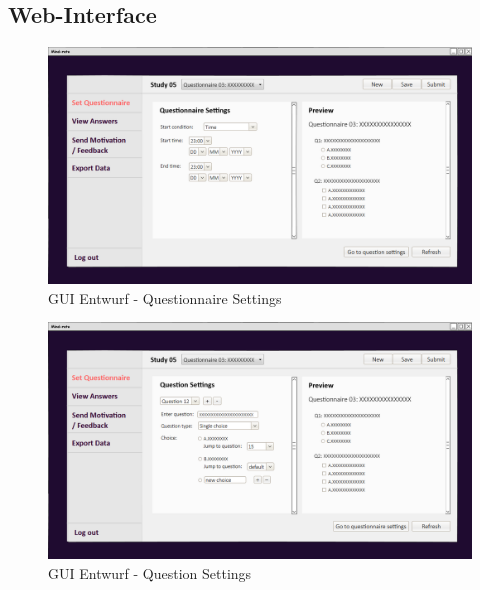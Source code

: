 \documentclass[a4paper]{scrreprt}
\begin{document}
            \vspace*{1cm}
            \subsection{\gls{Web-Interface}}
                \vspace*{1.5cm}
                \begin{figure}[ht]
                    \centering
                    \includegraphics[scale = 0.25]{web_set1.png}
                    \caption{GUI Entwurf - Questionnaire Settings}
                \end{figure}

                \begin{figure}[ht]
                    \centering
                    \includegraphics[scale = 0.25]{web_set2.png}
                    \caption{GUI Entwurf - Question Settings}
                \end{figure}
\end{document}

